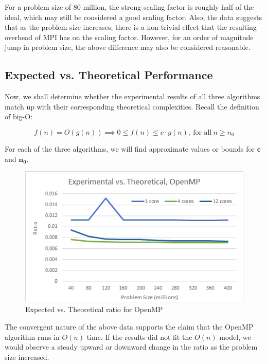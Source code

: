 \documentclass{article}
\begin{document}
For a problem size of 80 million, the strong scaling factor is roughly half of the ideal, which may still be considered a good scaling factor.  Also, the data suggests that as the problem size increases, there is a non-trivial effect that the resulting overhead of MPI has on the scaling factor.  However, for an order of magnitude jump in problem size, the above difference may also be considered reasonable.

\subsection*{Expected vs. Theoretical Performance}

Now, we shall determine whether the experimental results of all three algorithms match up with their corresponding theoretical complexities.  Recall the definition of big-O:

$$f(n) = O(g(n)) \implies 0 \leq f(n) \leq c \cdot g(n),\ \text{for all}\ n \geq n_0$$

For each of the three algorithms, we will find approximate values or bounds for $\mathbf{c}$ and $\mathbf{n_0}$.

\begin{figure}[H]
	\centering

	\includegraphics[width=1.0\textwidth]{figures/evt_omp.png}

	\caption{Expected vs. Theoretical ratio for OpenMP}
\end{figure}

The convergent nature of the above data supports the claim that the OpenMP algorithm runs in $O(n)$ time.  If the results did not fit the $O(n)$ model, we would observe a steady upward or downward change in the ratio as the problem size increased. \\
\end{document}
